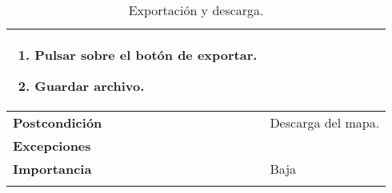 \begin{longtable}[H]{@{}l|l@{}}
\begin{minipage}[t]{0.71\columnwidth}
\begin{enumerate}
			\def\labelenumi{\arabic{enumi}.}
			\tightlist
			\item Pulsar sobre el botón de exportar.
			\item Guardar archivo. 
		\end{enumerate}
	\end{minipage}\tabularnewline
	\midrule
	\begin{minipage}[t]{0.23\columnwidth}\raggedright\strut
		\textbf{Postcondición}\strut
	\end{minipage} & \begin{minipage}[t]{0.71\columnwidth}\raggedright\strut
		Descarga del mapa.
	\end{minipage}\tabularnewline
	\midrule
	\begin{minipage}[t]{0.23\columnwidth}\raggedright\strut
		\textbf{Excepciones}\strut
	\end{minipage} & \begin{minipage}[t]{0.71\columnwidth}\raggedright
		
	\end{minipage}\tabularnewline
	\midrule
	\begin{minipage}[t]{0.23\columnwidth}\raggedright\strut
		\textbf{Importancia}\strut
	\end{minipage} & \begin{minipage}[t]{0.71\columnwidth}\raggedright\strut
		Baja\strut
	\end{minipage}\tabularnewline
	\bottomrule
	\caption{Exportación y descarga.}
	\label{cu:3.4}
\end{longtable}
\newpage

